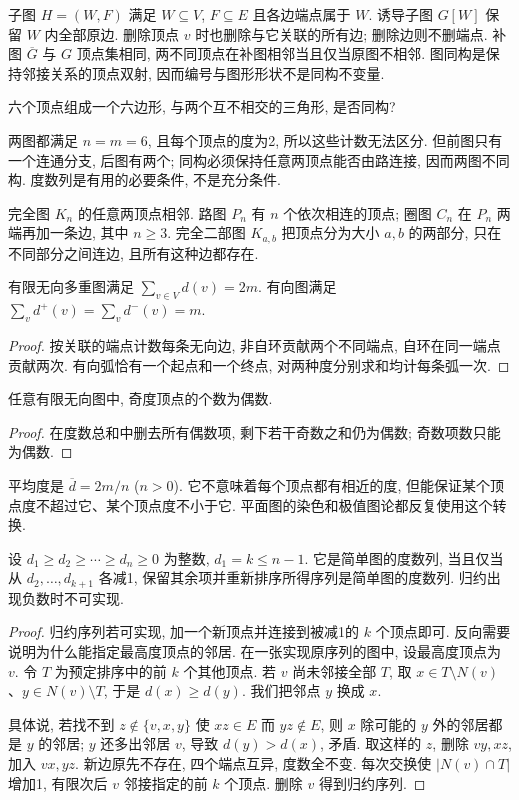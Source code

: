 子图 $H=(W,F)$ 满足 $W\subseteq V$, $F\subseteq E$ 且各边端点属于 $W$. 诱导子图 $G[W]$ 保留 $W$ 内全部原边. 删除顶点 $v$ 时也删除与它关联的所有边; 删除边则不删端点. 补图 $\overline G$ 与 $G$ 顶点集相同, 两不同顶点在补图相邻当且仅当原图不相邻. 图同构是保持邻接关系的顶点双射, 因而编号与图形形状不是同构不变量.
\begin{example}
六个顶点组成一个六边形, 与两个互不相交的三角形, 是否同构?
\end{example}
\begin{solution}
两图都满足 $n=m=6$, 且每个顶点的度为2, 所以这些计数无法区分. 但前图只有一个连通分支, 后图有两个; 同构必须保持任意两顶点能否由路连接, 因而两图不同构. 度数列是有用的必要条件, 不是充分条件.
\end{solution}
完全图 $K_n$ 的任意两顶点相邻. 路图 $P_n$ 有 $n$ 个依次相连的顶点; 圈图 $C_n$ 在 $P_n$ 两端再加一条边, 其中 $n\ge3$. 完全二部图 $K_{a,b}$ 把顶点分为大小 $a,b$ 的两部分, 只在不同部分之间连边, 且所有这种边都存在.
\begin{theorem}[握手引理]\label{thm:handshake}
有限无向多重图满足 $\sum_{v\in V}d(v)=2m$. 有向图满足 $\sum_v d^+(v)=\sum_v d^-(v)=m$.
\end{theorem}
\begin{proof}
按关联的端点计数每条无向边, 非自环贡献两个不同端点, 自环在同一端点贡献两次. 有向弧恰有一个起点和一个终点, 对两种度分别求和均计每条弧一次.
\end{proof}
\begin{corollary}
任意有限无向图中, 奇度顶点的个数为偶数.
\end{corollary}
\begin{proof}
在度数总和中删去所有偶数项, 剩下若干奇数之和仍为偶数; 奇数项数只能为偶数.
\end{proof}
平均度是 $\overline d=2m/n$ ($n>0$). 它不意味着每个顶点都有相近的度, 但能保证某个顶点度不超过它、某个顶点度不小于它. 平面图的染色和极值图论都反复使用这个转换.
\begin{theorem}\label{thm:hh}
设 $d_1\ge d_2\ge\cdots\ge d_n\ge0$ 为整数, $d_1=k\le n-1$. 它是简单图的度数列, 当且仅当从 $d_2,\ldots,d_{k+1}$ 各减1, 保留其余项并重新排序所得序列是简单图的度数列. 归约出现负数时不可实现.
\end{theorem}
\begin{proof}
归约序列若可实现, 加一个新顶点并连接到被减1的 $k$ 个顶点即可. 反向需要说明为什么能指定最高度顶点的邻居. 在一张实现原序列的图中, 设最高度顶点为 $v$. 令 $T$ 为预定排序中的前 $k$ 个其他顶点. 若 $v$ 尚未邻接全部 $T$, 取 $x\in T\setminus N(v)$、$y\in N(v)\setminus T$, 于是 $d(x)\ge d(y)$. 我们把邻点 $y$ 换成 $x$.

具体说, 若找不到 $z\notin\{v,x,y\}$ 使 $xz\in E$ 而 $yz\notin E$, 则 $x$ 除可能的 $y$ 外的邻居都是 $y$ 的邻居; $y$ 还多出邻居 $v$, 导致 $d(y)>d(x)$, 矛盾. 取这样的 $z$, 删除 $vy,xz$, 加入 $vx,yz$. 新边原先不存在, 四个端点互异, 度数全不变. 每次交换使 $|N(v)\cap T|$ 增加1, 有限次后 $v$ 邻接指定的前 $k$ 个顶点. 删除 $v$ 得到归约序列.
\end{proof}
